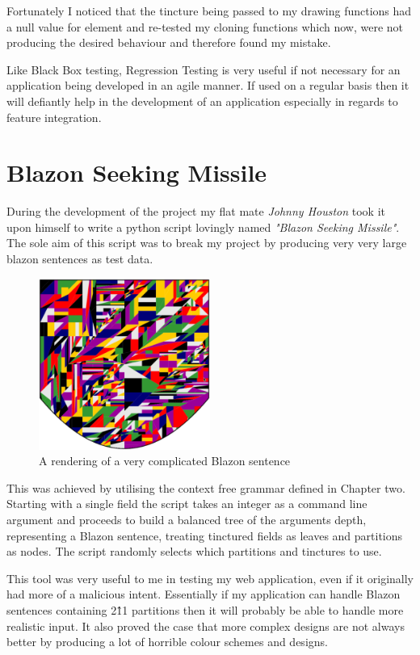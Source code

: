 Fortunately I noticed that the tincture being passed to my drawing functions had a null value for element and re-tested my cloning functions which now, were not producing the desired behaviour and therefore found my mistake. 


Like Black Box testing, Regression Testing is very useful if not necessary for an application being developed in an agile manner.  If used on a regular basis then it will defiantly help in the development of an application especially in regards to feature integration.  


\section{Blazon Seeking Missile} 

During the development of the project my flat mate \emph{Johnny Houston} took it upon himself to write a python script lovingly named \emph{"Blazon Seeking Missile"}.  The sole aim of this script was to break my project by producing very very large blazon sentences as test data.  


\begin{figure}[H]
  \centering
    \includegraphics[width=0.5\textwidth]{testing/images/bigmess.eps}
  \caption{A rendering of a very complicated Blazon sentence}
  
\end{figure}


This was achieved by utilising the context free grammar defined in Chapter two.  Starting with a single field the script takes an integer as a command line argument and proceeds to build a balanced tree of the arguments depth, representing a Blazon sentence, treating tinctured fields as leaves and partitions as nodes.   The script randomly selects which partitions and tinctures to use.  

This tool was very useful to me in testing my web application, even if it originally had more of a malicious intent.  Essentially if my application can handle Blazon sentences containing 2\^11 partitions then it will probably be able to handle more realistic input.  It also proved the case that more complex designs are not always better by producing a lot of horrible colour schemes and designs.  


